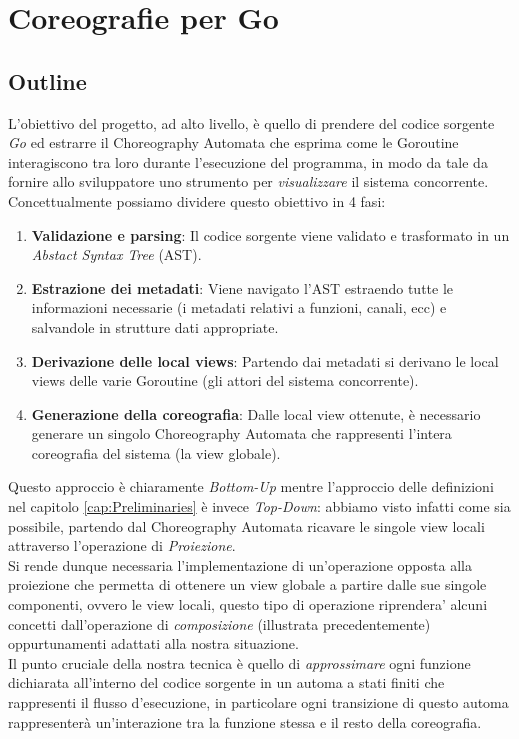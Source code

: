 \chapter{Coreografie per Go}
\section{Outline} \label{sec:GoOutline}
L'obiettivo del progetto, ad alto livello, è quello di prendere del codice sorgente \emph{Go} ed estrarre il Choreography Automata che esprima come le Goroutine interagiscono tra loro durante l'esecuzione del programma, in modo da tale da fornire allo sviluppatore uno strumento per \emph{visualizzare} il sistema concorrente.\\
Concettualmente possiamo dividere questo obiettivo in 4 fasi:
\begin{enumerate}
    \item \textbf{Validazione e parsing}: Il codice sorgente viene validato e trasformato in un \emph{Abstact Syntax Tree} (AST).
    \item \textbf{Estrazione dei metadati}: Viene navigato l'AST estraendo tutte le informazioni necessarie (i metadati relativi a funzioni, canali, ecc) e salvandole in strutture dati appropriate.
    \item \textbf{Derivazione delle local views}: Partendo dai metadati si derivano le local views delle varie Goroutine (gli attori del sistema concorrente).
    \item \textbf{Generazione della coreografia}: Dalle local view ottenute, è necessario generare un singolo Choreography Automata che rappresenti l'intera coreografia del sistema (la view globale).
\end{enumerate}
Questo approccio è chiaramente \emph{Bottom-Up} mentre l'approccio delle definizioni nel capitolo \ref{cap:Preliminaries} è invece \emph{Top-Down}: abbiamo visto infatti come sia possibile, partendo dal Choreography Automata ricavare le singole view locali attraverso l'operazione di \emph{Proiezione}.\\
Si rende dunque necessaria l'implementazione di un'operazione opposta alla proiezione che permetta di ottenere un view globale a partire dalle sue singole componenti, ovvero le view locali, questo tipo di operazione riprendera' alcuni concetti dall'operazione di \emph{composizione} (illustrata precedentemente) oppurtunamenti adattati alla nostra situazione. \\
Il punto cruciale della nostra tecnica è quello di \emph{approssimare} ogni funzione dichiarata all'interno del codice sorgente in un automa a stati finiti che rappresenti il flusso d'esecuzione, in particolare ogni transizione di questo automa rappresenterà un'interazione tra la funzione stessa e il resto della coreografia. \bigskip \\
